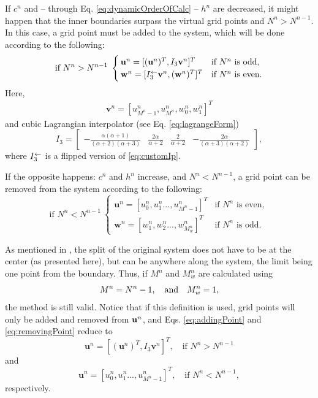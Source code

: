If $c^n$ and -- through Eq. \eqref{eq:dynamicOrderOfCalc} -- $h^n$ are decreased, it might happen that the inner boundaries surpass the virtual grid points and $N^n > N^{n-1}$. In this case, a grid point must be added to the system, which will be done according to the following:
\begin{equation}\label{eq:addingPoint}
    \text{if } N^n>N^{n-1}\ \begin{cases}\mathbf{u}^n = [(\mathbf{u}^n)^T, I_3\mathbf{v}^n]^T & \text{if $N^n $ is odd},\\
    \mathbf{w}^n = [I_3^\leftarrow\mathbf{v}^n, (\mathbf{w}^n)^T]^T & \text{if $ N^n$ is even}.
    \end{cases}
\end{equation}
Here, 
\begin{align*}
\mathbf{v}^n = [u_{M^n-1}^n, u_{M^n}^n, w_0^n, w_1^n]^T%
\end{align*}
and cubic Lagrangian interpolator (see Eq. \eqref{eq:lagrangeForm})
\begin{equation}\label{eq:customIp}
I_3 = \begin{bmatrix} -\frac{\alpha(\alpha+1)}{(\alpha+2)(\alpha+3)} &\frac{2\alpha}{\alpha+2} &\frac{2}{\alpha+2} 
&-\frac{2\alpha}{(\alpha+3)(\alpha+2)}
\end{bmatrix},
\end{equation}
where $I_3^\leftarrow$ is a flipped version of \eqref{eq:customIp}.

If the opposite happens: $c^n$ and $h^n$ increase, and $N^n<N^{n-1}$, a grid point can be removed from the system according to the following:
\begin{equation}\label{eq:removingPoint}
\text{if } N^n<N^{n-1}\ \begin{cases}
    \mathbf{u}^n = [u_0^n, u_1^n ..., u_{M^n-1}^n]^T & \text{if $N^n$ is even}, \\
        \mathbf{w}^n = [w_1^n, w_2^n ..., w_{M_w^n}^n]^T & \text{if $N^n$ is odd}.
    \end{cases}
\end{equation}

As mentioned in \citeP[G], the split of the original system  does not have to be at the center (as presented here), but can be anywhere along the system, the limit being one point from the boundary. Thus, if $M^n$ and $M_w^n$ are calculated using 
\begin{equation} \label{eq:alternativeM}
    M^n = N^n - 1,\quad \text{and} \quad  M_w^n= 1,
\end{equation}
the method is still valid. Notice that if this definition is used, grid points will only be added and removed from $\mathbf{u}^n$, and Eqs. \eqref{eq:addingPoint} and \eqref{eq:removingPoint} reduce to
\begin{equation}\label{eq:alternativeAddingPoint}
    \mathbf{u}^n = [(\mathbf{u}^n)^T, I_3\mathbf{v}^n]^T,\quad \text{if } N^n>N^{n-1}
\end{equation}
and 
\begin{equation}
    \mathbf{u}^n = [u_0^n, u_1^n ..., u_{M^n-1}^n]^T,\quad \text{if } N^n<N^{n-1},
\end{equation}
respectively.
